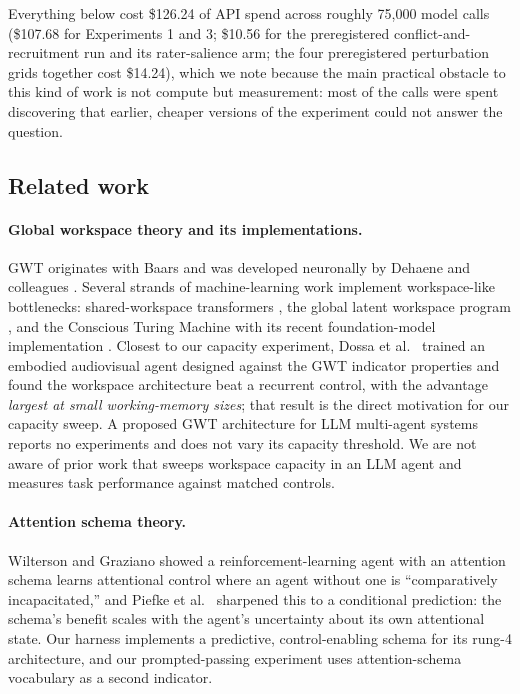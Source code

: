 \documentclass[11pt]{article}
\begin{document}
Everything below cost \$126.24 of API spend across roughly 75{,}000 model calls (\$107.68 for Experiments 1 and 3; \$10.56 for the preregistered conflict-and-recruitment run and its rater-salience arm; the four preregistered perturbation grids together cost \$14.24), which we note because the main practical
obstacle to this kind of work is not compute but measurement: most of the
calls were spent discovering that earlier, cheaper versions of the experiment
could not answer the question.

\subsection{Related work}
\label{sec:related}

\paragraph{Global workspace theory and its implementations.}
GWT originates with Baars \cite{baars1988} and was developed neuronally by
Dehaene and colleagues \cite{dehaene2014}. Several strands of machine-learning
work implement workspace-like bottlenecks: shared-workspace transformers
\cite{goyal2022}, the global latent workspace program \cite{vanrullen2021}, and
the Conscious Turing Machine \cite{blum2024} with its recent foundation-model
implementation \cite{yu2026}. Closest to our capacity experiment, Dossa et al.\
\cite{dossa2024} trained an embodied audiovisual agent designed against the GWT
indicator properties and found the workspace architecture beat a recurrent
control, with the advantage \emph{largest at small working-memory sizes}; that
result is the direct motivation for our capacity sweep. A proposed GWT
architecture for LLM multi-agent systems \cite{shang2026} reports no experiments
and does not vary its capacity threshold. We are not aware of prior work that
sweeps workspace capacity in an LLM agent and measures task performance against
matched controls.

\paragraph{Attention schema theory.}
Wilterson and Graziano \cite{wilterson2021} showed a reinforcement-learning agent
with an attention schema learns attentional control where an agent without one is
``comparatively incapacitated,'' and Piefke et al.\ \cite{piefke2024} sharpened
this to a conditional prediction: the schema's benefit scales with the agent's
uncertainty about its own attentional state. Our harness implements a predictive,
control-enabling schema for its rung-4 architecture, and our prompted-passing experiment
uses attention-schema vocabulary as a second indicator.
\end{document}
